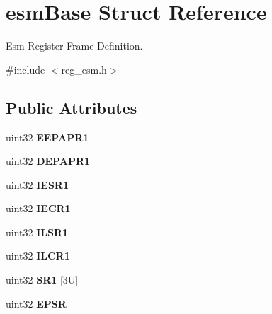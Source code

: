 \hypertarget{structesmBase}{}\section{esm\+Base Struct Reference}
\label{structesmBase}


Esm Register Frame Definition.  




{\ttfamily \#include $<$reg\+\_\+esm.\+h$>$}

\subsection*{Public Attributes}
\begin{DoxyCompactItemize}
\item 
\mbox{\label{structesmBase_a129a335e28c75fa7b5a2332eec661c65}} 
uint32 {\bfseries E\+E\+P\+A\+P\+R1}
\item 
\mbox{\label{structesmBase_addcde5c58361272c0017c94900c95faa}} 
uint32 {\bfseries D\+E\+P\+A\+P\+R1}
\item 
\mbox{\label{structesmBase_ac533ee636243f46c84bb4fac6209ecbf}} 
uint32 {\bfseries I\+E\+S\+R1}
\item 
\mbox{\label{structesmBase_a1a43f9e88c63404765cfacd3b8f5ca63}} 
uint32 {\bfseries I\+E\+C\+R1}
\item 
\mbox{\label{structesmBase_afb276826ecbc85160f496c77b2794548}} 
uint32 {\bfseries I\+L\+S\+R1}
\item 
\mbox{\label{structesmBase_a634ee2e710d68aad4e89b1c250ff7c11}} 
uint32 {\bfseries I\+L\+C\+R1}
\item 
\mbox{\label{structesmBase_a374e07ae5401282c28bdfb7ccfa1b9b4}} 
uint32 {\bfseries S\+R1} \mbox{[}3\+U\mbox{]}
\item 
\mbox{\label{structesmBase_ac62ecf95677eb48516d42fe451f6f562}} 
uint32 {\bfseries E\+P\+SR}
\item 
\mbox{\label{structesmBase_aa56e099848b5815e4f4133c3b28620fc}} 

\end{DoxyCompactItemize}
